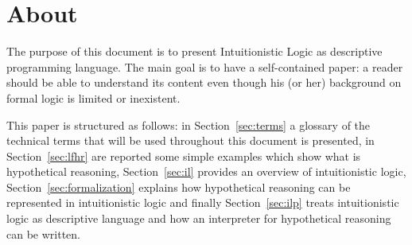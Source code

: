 \section{About}
The purpose of this document is to present Intuitionistic Logic as descriptive
programming language. The main goal is to
have a self-contained paper: a reader should be able to understand its content
even though his (or her) background on formal logic is limited or inexistent.

This paper is structured as follows: in Section~\ref{sec:terms} a glossary of the
technical terms that will be used throughout this document is presented, in Section~\ref{sec:lfhr}
are reported some simple examples which show what is
hypothetical reasoning, Section~\ref{sec:il} provides an overview of intuitionistic
logic, Section~\ref{sec:formalization} explains how hypothetical reasoning can be
represented in intuitionistic logic and finally Section~\ref{sec:ilp} treats
intuitionistic logic as descriptive language and how an interpreter
for hypothetical reasoning can be written.
